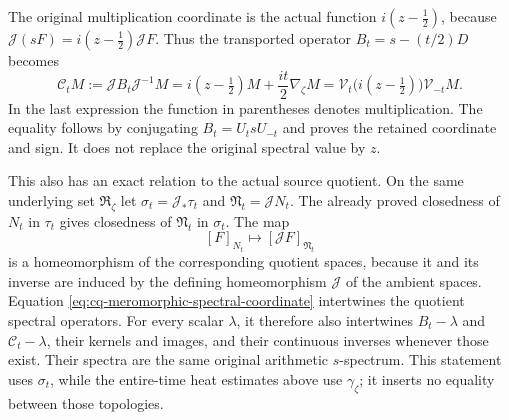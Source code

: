 The original multiplication coordinate is the actual function
$i(z-\tfrac12)$, because
$\mathscr J(sF)=i(z-\tfrac12)\mathscr JF$. Thus the transported
operator $B_t=s-(t/2)D$ becomes
\begin{equation}\label{eq:cq-meromorphic-spectral-coordinate}
 \mathcal C_tM
 :=\mathscr JB_t\mathscr J^{-1}M
 =i(z-\tfrac12)M+\frac{it}{2}\nabla_\zeta M
 =\mathcal V_t\bigl(i(z-\tfrac12)\bigr)\mathcal V_{-t}M.
\end{equation}
In the last expression the function in parentheses denotes
multiplication. The equality follows by conjugating
$B_t=U_t sU_{-t}$ and proves the retained coordinate and sign.
It does not replace the original spectral value by $z$.

This also has an exact relation to the actual source quotient.
On the same underlying set $\mathfrak R_\zeta$ let
$\sigma_t=\mathscr J_*\tau_t$ and
$\mathfrak N_t=\mathscr JN_t$. The already proved closedness of
$N_t$ in $\tau_t$ gives closedness of $\mathfrak N_t$ in
$\sigma_t$. The map
\[
 [F]_{N_t}\longmapsto[\mathscr JF]_{\mathfrak N_t}
\]
is a homeomorphism of the corresponding quotient spaces, because
it and its inverse are induced by the defining homeomorphism
$\mathscr J$ of the ambient spaces. Equation
\eqref{eq:cq-meromorphic-spectral-coordinate} intertwines the
quotient spectral operators. For every scalar $\lambda$, it
therefore also intertwines $B_t-\lambda$ and
$\mathcal C_t-\lambda$, their kernels and images, and their
continuous inverses whenever those exist. Their spectra are the
same original arithmetic $s$-spectrum. This statement uses
$\sigma_t$, while the entire-time heat estimates above use
$\gamma_\zeta$; it inserts no equality between those topologies.

